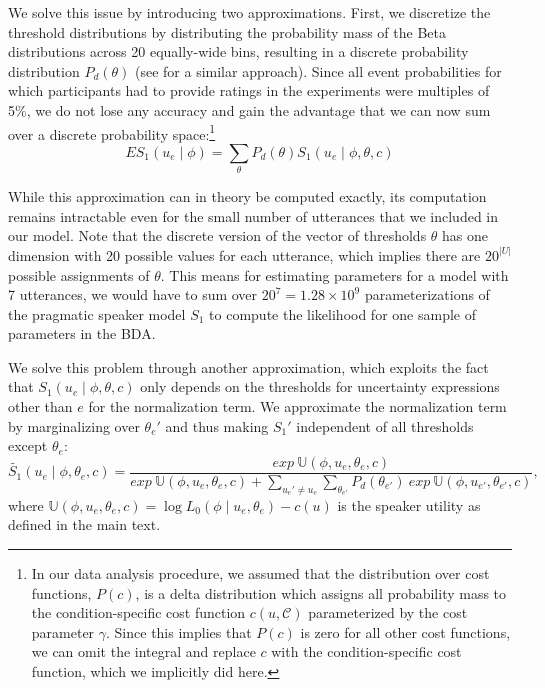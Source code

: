 \documentclass[man, floatsintext]{apa6}
\begin{document}
We solve this issue by introducing two approximations. First, we discretize the threshold distributions by distributing the probability mass
of the Beta distributions across 20 equally-wide bins, resulting in a discrete probability distribution $P_{d}(\theta)$ (see \cite{Tessler2019} for a similar approach). Since all event probabilities for which participants had to provide ratings in the
experiments were multiples of 5\%, we do not lose any accuracy and gain the advantage that we can now sum over a discrete probability space:\footnote{In our data analysis procedure, we assumed that the 
distribution over cost functions, $P(c)$, is a delta distribution which assigns all probability mass to the condition-specific cost function 
$c(u, \mathscr{C})$ parameterized by the cost parameter $\gamma$. Since this implies that $P(c)$ is zero for all other cost functions, we can omit the integral and replace $c$ 
with the condition-specific cost function, which we implicitly did here.}
$$ES_1\left(u_e \mid \phi \right) = \sum_{\theta} P_{d}(\theta) S_1\left(u _e\mid \phi, \theta, c\right)$$

While this approximation can in theory be computed exactly, its computation remains intractable even 
for the small number of utterances that we included in our model. Note that the discrete version of the
vector of thresholds $\theta$ has one dimension with 20 possible values for each utterance, which implies
there are $20^{|U|}$ possible assignments of $\theta$. This means for estimating parameters for 
a model with 7 utterances, we would have to sum over $20^{7}=1.28 \times 10^9$ 
parameterizations of the pragmatic speaker model $S_1$ to compute the likelihood for one 
sample of parameters in the BDA. 

We solve this problem through another approximation, which exploits the fact that 
$S_1(u _e \mid \phi, \theta, c)$ only depends on the thresholds for uncertainty
expressions other than $e$ for the normalization term. We approximate the normalization term by 
marginalizing over $\theta_e'$ and thus making $S_1'$ independent of all thresholds except $\theta_e$:
$$\widetilde{S_1}(u_e \mid \phi, \theta_e, c) = \frac{exp \ \mathbb{U}(\phi, u_e, \theta_e, c) } { exp \ \mathbb{U}(\phi, u_e, \theta_e, c) + 
\sum_{u_e' \ne u_e}{ \sum_{\theta_{e'}} P_d(\theta_{e'}) \  exp \ \mathbb{U}(\phi, u_{e'}, \theta_{e'}, c) } }, $$
where $\mathbb{U}(\phi, u_e, \theta_e, c) = \log L_0(\phi \mid u_e, \theta_e) - c(u) $ is the speaker utility as defined in the main text.
\end{document}
